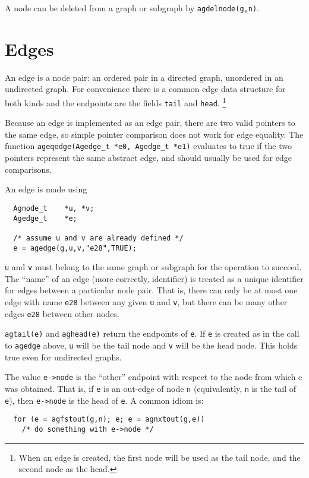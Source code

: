 \documentclass[11pt,letterpaper]{article}
\begin{document}
A node can be deleted from a graph or subgraph by \verb"agdelnode(g,n)".

\section{Edges}
\label{sec:edges}
An edge is a node pair: an ordered pair in a directed graph,
unordered in an undirected graph.  For convenience there is
a common edge data structure for both kinds and the endpoints
are the fields \verb"tail" and \verb"head". \footnote{When an edge is created,
the first node will be used as the tail node, and the second node as the head.}

Because an edge is implemented as an edge pair, there are two valid pointers
to the same edge, so simple pointer comparison does not work for edge equality.
The function \verb"ageqedge(Agedge_t *e0, Agedge_t *e1)" evaluates to true if
the two pointers represent the same abstract edge, and should usually be used
for edge comparisons.

An edge is made using

\begin{verbatim}
  Agnode_t    *u, *v;
  Agedge_t    *e;
    
  /* assume u and v are already defined */
  e = agedge(g,u,v,"e28",TRUE);
\end{verbatim}

\verb"u" and \verb"v" must belong to the same graph or subgraph
for the operation to succeed.  The ``name'' of an edge
(more correctly, identifier) is treated as a unique identifier for edges
between a particular node pair.  That is, there can only be at most
one edge with name \verb"e28" between any given \verb"u" and \verb"v",
but there can be many other edges \verb"e28" between other nodes.

\verb"agtail(e)" and \verb"aghead(e)" return the endpoints of \verb"e".
If \verb"e" is created as in the call to \verb"agedge" above, \verb"u"
will be the tail node and \verb"v" will be the head node. This holds true
even for undirected graphs.

The value \verb"e->node" is the ``other'' endpoint
with respect to the node from which e was obtained.
That is, if \verb"e" is an out-edge of node \verb"n" (equivalently, \verb"n"
is the tail of \verb"e"), then \verb"e->node" is the head of \verb"e".
A common idiom is: 
\begin{verbatim}
  for (e = agfstout(g,n); e; e = agnxtout(g,e)) 
    /* do something with e->node */
\end{verbatim}
\end{document}
